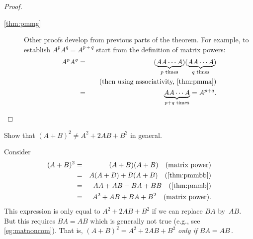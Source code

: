 \begin{proof}
\begin{description}
\item[\ref{thm:pmmg}]
Other proofs develop from previous parts of the theorem.
For example, to establish \(A^pA^q=A^{p+q}\) start from the definition of matrix powers:
\begin{eqnarray*}
A^pA^q&=&(\underbrace{AA\cdots A}_{p\text{ times}})
(\underbrace{AA\cdots A}_{q\text{ times}})
\\&&\quad(\text{then using associativity, \cref{thm:pmma}})
\\&=&\underbrace{AA\cdots A}_{p+q\text{ times}}
=A^{p+q}.
\end{eqnarray*}

\end{description}
\end{proof}



\begin{example} 
Show that \((A+B)^2\neq A^2+2AB+B^2\)  in general.
\begin{solution} 
Consider
\begin{eqnarray*}
(A+B)^2&=& (A+B)(A+B) \quad(\text{matrix power})
\\&=&A(A+B)+B(A+B) \quad(\text{\cref{thm:pmmbb}})
\\&=&AA+AB+BA+BB \quad(\text{\cref{thm:pmmb}})
\\&=&A^2+AB+BA+B^2 \quad(\text{matrix power}).
\end{eqnarray*}
This expression is only equal to \(A^2+2AB+B^2\) if we can replace \(BA\) by~\(AB\).  
But this requires \(BA=AB\) which is generally not true (e.g., see \cref{eg:matnoncom}).
That is, \((A+B)^2= A^2+2AB+B^2\) \emph{only if} \(BA=AB\)\,.
\end{solution}
\end{example}




